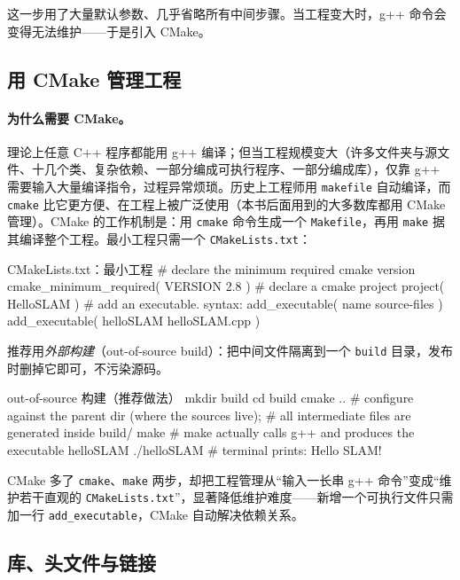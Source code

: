 \noindent 这一步用了大量默认参数、几乎省略所有中间步骤。当工程变大时，g++ 命令会变得无法维护——于是引入 CMake。

\subsection{用 CMake 管理工程}
\label{sec:intro-cmake}
\paragraph{为什么需要 CMake。}
理论上任意 C++ 程序都能用 g++ 编译；但当工程规模变大（许多文件夹与源文件、十几个类、复杂依赖、一部分编成可执行程序、一部分编成库），仅靠 g++ 需要输入大量编译指令，过程异常烦琐。历史上工程师用 \texttt{makefile} 自动编译，而 \texttt{cmake} 比它更方便、在工程上被广泛使用（本书后面用到的大多数库都用 CMake 管理）。CMake 的工作机制是：用 \texttt{cmake} 命令生成一个 \texttt{Makefile}，再用 \texttt{make} 据其编译整个工程。最小工程只需一个 \texttt{CMakeLists.txt}：

\begin{codebox}[text]{CMakeLists.txt：最小工程}
# declare the minimum required cmake version
cmake_minimum_required( VERSION 2.8 )
# declare a cmake project
project( HelloSLAM )
# add an executable.  syntax: add_executable( name source-files )
add_executable( helloSLAM helloSLAM.cpp )
\end{codebox}

\noindent 推荐用\emph{外部构建}（out-of-source build）：把中间文件隔离到一个 \texttt{build} 目录，发布时删掉它即可，不污染源码。

\begin{codebox}[bash]{out-of-source 构建（推荐做法）}
mkdir build
cd build
cmake ..     # configure against the parent dir (where the sources live);
             # all intermediate files are generated inside build/
make         # make actually calls g++ and produces the executable helloSLAM
./helloSLAM  # terminal prints: Hello SLAM!
\end{codebox}

\noindent CMake 多了 \texttt{cmake}、\texttt{make} 两步，却把工程管理从“输入一长串 g++ 命令”变成“维护若干直观的 \texttt{CMakeLists.txt}”，显著降低维护难度——新增一个可执行文件只需加一行 \texttt{add\_executable}，CMake 自动解决依赖关系。

\subsection{库、头文件与链接}
\label{sec:intro-lib}

